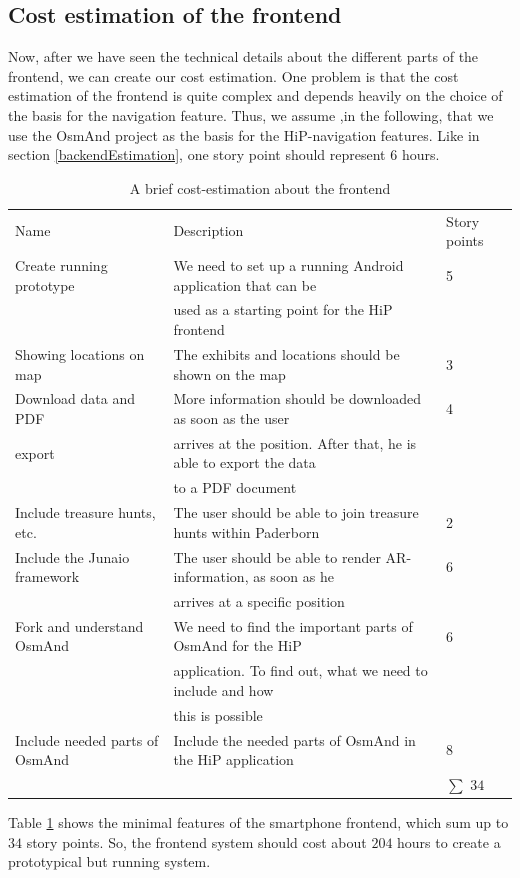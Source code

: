 \subsection{Cost estimation of the frontend}	
Now, after we have seen the technical details about the different parts of the frontend, we can create our cost estimation. One problem is that the cost estimation of the frontend is quite complex and depends heavily on the choice of the basis for the navigation feature. Thus, we assume ,in the following, that we use the \ac{OsmAnd} project as the basis for the \ac{HiP}-navigation features. Like in section \ref{backendEstimation}, one story point should represent 6 hours.

 \begin{table}[th]
\scriptsize
 \caption{A brief cost-estimation about the frontend}
 \begin{tabular}{lll}
	\toprule
  	Name & Description & Story points \\ 
	\cmidrule(rl){1-1}\cmidrule(rl){2-2}\cmidrule(rl){3-3}
	Create running prototype		&	We need to set up a running Android application that can be			&	5 \\	
							& 	 used as a starting point for the \ac{HiP} frontend					& 	\\
	Showing locations on map	&	The exhibits and locations should be shown on the map			&	3 \\	
	Download data and PDF	 	&	More information should be downloaded as soon as the user		&	4 \\	
	export					& 	arrives at the position. After that, he is able to export the data		&	\\
							& 	to a \ac{PDF} document										& 	\\
	Include treasure hunts, etc.	&	The user should be able to join treasure hunts within Paderborn		&	2 \\	
	Include the Junaio framework	&	The user should be able to render AR-information, as soon as he		&	6 \\			
							&	arrives at a specific position									&	\\
	Fork and understand \ac{OsmAnd}	&	We need to find the important parts of \ac{OsmAnd} for the \ac{HiP}	&	6 \\
							&	application. To find out, what we need to include and how 			&	\\
							&	this is possible												& \\
	Include needed parts of \ac{OsmAnd}	&	Include the needed parts of \ac{OsmAnd} in the \ac{HiP} application	&	8 \\	
					  	 	& 												& $\sum$ $34$   \\			
	\bottomrule
 \end{tabular}
 \label{tab:costFrontend}
 \end{table} 

Table \ref{tab:costFrontend} shows the minimal features of the smartphone frontend, which sum up to $34$ story points. So, the frontend system should cost about $204$ hours to create a prototypical but running system. 
